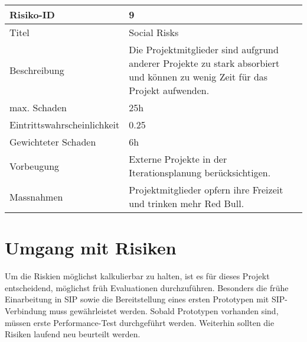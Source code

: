 \noindent
\begin{tabular}{|p{} | p{} |}
	\hline
	Risiko-ID & 9 \\
	\hline
	Titel & Social Risks \\
	Beschreibung & Die Projektmitglieder sind aufgrund anderer Projekte zu stark
	absorbiert und können zu wenig Zeit für das Projekt aufwenden. \\
	max. Schaden & 25h \\
	Eintrittswahrscheinlichkeit & 0.25 \\
	Gewichteter Schaden	& 6h \\
	Vorbeugung	& Externe Projekte in der Iterationsplanung berücksichtigen. \\
	Massnahmen	& Projektmitglieder opfern ihre Freizeit und trinken mehr Red Bull.
	\\
	\hline
\end{tabular}
\hspace{0.5cm}
\newline


\section{Umgang mit Risiken}
Um die Riskien möglichst kalkulierbar zu halten, ist es für dieses Projekt
entscheidend, möglichst früh Evaluationen durchzuführen. Besonders die frühe Einarbeitung in SIP sowie die Bereitstellung eines ersten
Prototypen mit SIP-Verbindung muss gewährleistet werden. Sobald Prototypen
vorhanden sind, müssen erste Performance-Test durchgeführt werden. Weiterhin
sollten die Risiken laufend neu beurteilt werden.
